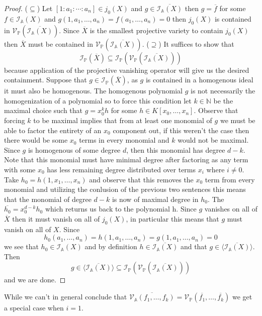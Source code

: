 \documentclass[40pt]{article}
\newcommand{\Proj}{\mathbb{P}}
\newcommand{\N}{\mathbb{N}}
\newcommand{\A}{\mathbb{A}}
\newcommand{\I}{\mathcal{I}}
\newcommand{\V}{\mathcal{V}}
\newcommand{\la}{\langle}
\newcommand{\ra}{\rangle}
\theoremstyle{remark}
\begin{document}
		\begin{proof}
			($\subseteq $) %
			Let $[1:a_1:\cdots:a_n] \in j_0(X)$ and $g \in \overline{\I_\A(X)}$ then $g = \overline f$ for some $f \in \I_\A(X)$ and $g(1,a_1,\dots,a_n) = f(a_1,\dots,a_n) = 0$ then $j_0(X)$ is contained in $\V_\Proj(\overline{\I_\A(X)})$. Since $\overline X$ is the smallest projective variety to contain $j_0(X)$ then $\overline X$ must be contained in $\V_\Proj(\overline{\I_\A(X)})$. ($\supseteq$) It suffices to show that 
			\[
			\I_\Proj(\overline X) \subseteq \I_\Proj(\V_\Proj(\overline{\I_\A(X)}))
			\]
			because application of the projective vanishing operator will give us the desired containment. Suppose that $g \in \I_\Proj(\overline X)$, as $g$ is contained in a homogenous ideal it must also be homogenous. The homogenous polynomial $g$ is not necessarily the homogenization of a polynomial so to force this condition let $k \in \N$ be the maximal choice such that $g = x_0^kh$ for some $h \in K[x_0,\dots,x_n]$. Observe that forcing $k$ to be maximal implies that from at least one monomial of $g$ we must be able to factor the entirety of an $x_0$ component out, if this weren't the case then there would be some $x_0$ terms in every monomial and $k$ would not be maximal. Since $g$ is homogenous of some degree $d$, then this monomial has degree $d - k$. Note that this monomial must have minimal degree after factoring as any term with some $x_0$ has less remaining degree distributed over terms $x_i$ where $i \neq 0$. Take $h_0 = h(1,x_1,\dots,x_n)$ and observe that this removes the $x_0$ term from every monomial and utilizing the conlusion of the previous two sentences this means that the monomial of degree $d - k$ is now of maximal degree in $h_0$. The $\overline{h_0} = x_0^{d-k}h_0$ which returns us back to the polynomial h. Since $g$ vanishes on all of $\overline X$ then it must vanish on all of $j_0(X)$, in particular this means that $g$ must vanish on all of $X$. Since 
			\[
			h_0(a_1,\dots,a_n) = h(1,a_1,\dots,a_n) = g(1,a_1,\dots,a_n) = 0
			\]
			we see that $h_0 \in \I_\A(X)$ and by definition $h \in \overline{\I_\A(X)}$ and that $g \in \la \overline{\I_\A(X)}\ra$. Then 
			\[
			g \in \la \overline{\I_\A(X)}\ra \subseteq \I_\Proj(\V_\Proj(\overline{\I_\A(X)}))
			\]
			and we are done. 
		\end{proof}
		While we can't in general conclude that $\overline{\V_\A(f_1,\dots,f_k)} = \V_\Proj(\overline{f_1},\dots,\overline{f_k})$ we get a special case when $i = 1$. 
\end{document}
